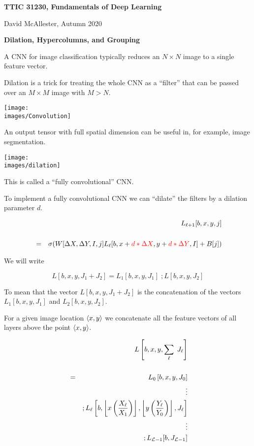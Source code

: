 




{\Huge

  \centerline{\bf TTIC 31230, Fundamentals of Deep Learning}
  \bigskip
  \centerline{David McAllester, Autumn 2020}

    \vfill
  \centerline{\bf Dilation, Hypercolumns, and Grouping}
  \vfill
  

A CNN for image classification typically reduces an $N \times N$ image to a single feature vector.

\vfill
Dilation is a trick for treating the whole CNN as a ``filter'' that can be passed over an $M \times M$ image with $M > N$.

\vfill
\centerline{\texttt{[image: \\images/Convolution]}}

\vfill
An output tensor with full spatial dimension can be useful in, for example, image segmentation.


\centerline{\texttt{[image: \\images/dilation]}}

\vfill
This is called a ``fully convolutional'' CNN.


To implement a fully convolutional CNN we can ``dilate'' the filters by a dilation parameter $d$.

\vfill
\begin{eqnarray*}
 & & L_{{\ell+1}}[b,x,y,j] \\
 \\
 & = &  \sigma(W[\Delta X, \Delta Y, I, j] L_{{\ell}}[b,x + {\color{red} d*\Delta X}, y + {\color{red} d*\Delta Y}, I] + B[j])
\end{eqnarray*}



We will write

\vfill
$$L[b,x,y,J_1+J_2] = L_1[b,x,y,J_1]\;;L[b,x,y,J_2]$$

\vfill
To mean that the vector $L[b,x,y,J_1+J_2]$ is the concatenation of the vectors $L_1[b,x,y,J_1]$ and $L_2[b,x,y,J_2]$.


For a given image location ${\mbox{$\langle x,y\rangle$}}$ we concatenate all the feature vectors of all layers above the point ${\mbox{$\langle x,y\rangle$}}$.

\vfill
\begin{eqnarray*}
& & L\left[b,x,y,\sum_\ell\;J_\ell\right] \\
\\
& = & L_0\left[b,x,y,J_0\right] \\
 & & \vdots \\
& &  ;L_\ell\left[b,\left\lfloor x\left(\frac{X_\ell}{X_1}\right) \right\rfloor,\left\lfloor y\left(\frac{Y_\ell}{Y_0}\right) \right\rfloor,J_\ell\right] \\
 & & \vdots \\
 & & ;L_{{\cal L}-1}[b,J_{{\cal L}-1}]
\end{eqnarray*}

}
